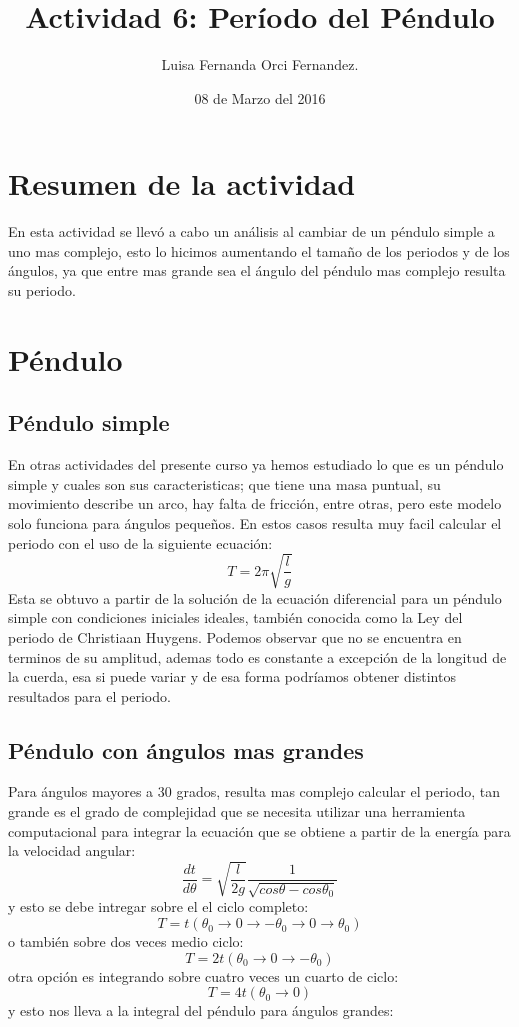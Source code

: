 \documentclass[12pt,letterpaper]{article}
\begin{document}
\title{Actividad 6: Período del Péndulo}
\author{Luisa Fernanda Orci Fernandez.}
\date{08 de Marzo del 2016}

\maketitle

\section*{Resumen de la actividad}

En esta actividad se llevó a cabo un análisis al cambiar de un péndulo simple a uno mas complejo, esto lo hicimos aumentando el tamaño de los periodos y de los ángulos, ya que entre mas grande sea el ángulo del péndulo mas complejo resulta su periodo. 

\section*{Péndulo}

\subsection*{Péndulo simple}

En otras actividades del presente curso ya hemos estudiado lo que es un péndulo simple y cuales son sus caracteristicas; que tiene una masa puntual, su movimiento describe un arco, hay falta de fricción, entre otras, pero este modelo solo funciona para ángulos pequeños. En estos casos resulta muy facil calcular el periodo con el uso de la siguiente ecuación:
$$ T = 2\pi\sqrt{\frac{l}{g}} $$ 
Esta se obtuvo a partir de la solución de la ecuación diferencial para un péndulo simple con condiciones iniciales ideales, también conocida como la Ley del periodo de Christiaan Huygens. Podemos observar que no se encuentra en terminos de su amplitud, ademas todo es constante a excepción de la longitud de la cuerda, esa si puede variar y de esa forma podríamos obtener distintos resultados para el periodo. 

\subsection*{Péndulo con ángulos mas grandes}
Para ángulos mayores a 30 grados, resulta mas complejo calcular el periodo, tan grande es el grado de complejidad que se necesita utilizar una herramienta computacional para integrar la ecuación que se obtiene a partir de la energía para la velocidad angular: $$ \frac{dt}{d\theta} = \sqrt{\frac{l}{2g}} \frac{1}{\sqrt{cos\theta - cos\theta_0}} $$ y esto se debe intregar sobre el el ciclo completo: $$ T = t(\theta_0 \rightarrow 0 \rightarrow -\theta_0 \rightarrow 0 \rightarrow \theta_0) $$ o también sobre dos veces medio ciclo: $$ T = 2t(\theta_0 \rightarrow 0 \rightarrow -\theta_0) $$ otra opción es integrando sobre cuatro veces un cuarto de ciclo:  $$ T = 4t(\theta_0 \rightarrow 0) $$ y esto nos lleva a la integral del péndulo para ángulos grandes: 
\end{document}
